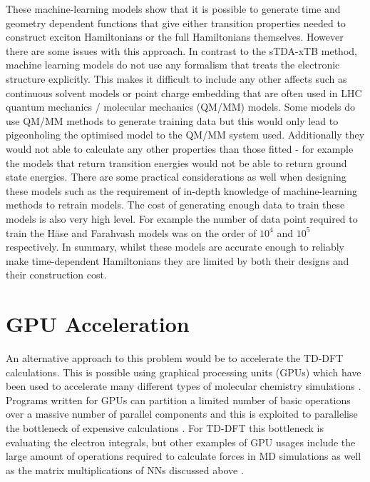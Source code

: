 These machine-learning models show that it is possible to generate time and geometry
dependent functions that give either transition properties needed to construct exciton
Hamiltonians or the full Hamiltonians themselves. However there are some issues 
with this approach. In contrast to the sTDA-xTB method, machine learning models 
do not use any formalism that treats the electronic structure explicitly. This makes 
it difficult to include any other affects such as continuous solvent models or 
point charge embedding that are often used in LHC quantum mechanics / molecular 
mechanics (QM/MM) models. Some models do use QM/MM methods to generate training 
data but this would only lead to pigeonholing the optimised model to the QM/MM system
used. Additionally they would not able to calculate any other properties than those
fitted - for example the models that return \Qy transition energies would not be 
able to return ground state energies. There are some practical considerations as 
well when designing these models such as the requirement of in-depth knowledge of
machine-learning methods to retrain models. The cost of generating enough data to
train these models is also very high level. For example the number of data point 
required to train the H\"{a}se and Farahvash models was on the order of $10^4$ and 
$10^5$ respectively. In summary, whilst these models are accurate enough to reliably
make time-dependent Hamiltonians they are limited by both their designs and their
construction cost.

\section{GPU Acceleration}
\label{sec:gpu_acceleration}

An alternative approach to this problem would be to accelerate the TD-DFT calculations.
This is possible using graphical processing units (GPUs) which have been used to
accelerate many different types of molecular chemistry simulations \cite{Pandey2022}. 
Programs written for GPUs can partition a limited number of basic operations over 
a massive number of parallel components and this is exploited to parallelise the
bottleneck of expensive calculations \cite{McIntosh-Smith2013}. For TD-DFT this 
bottleneck is evaluating the electron integrals, but other examples of GPU usages 
include the large amount of operations required to calculate forces in MD simulations 
as well as the matrix multiplications of NNs discussed above \cite{Ufimtsev2008, Friedrichs2009, Wu2012}.

